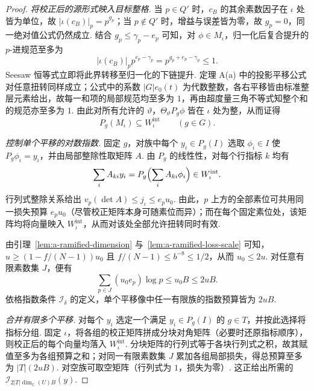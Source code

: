 \begin{proof}
\emph{将校正后的源形式映入目标整格.}
当 $p\in Q'$ 时，$c_B$ 的其余素数因子在 $\iota$ 处皆为单位，故 $|\iota(c_B)|_p=p^{g_p}$；当 $p\notin Q'$ 时，增益与误差皆为零，故 $g_p=0$，同一绝对值公式仍然成立. 结合 $g_p\le\gamma_p-e_p$ 可知，对 $\phi\in M_\iota$，归一化后复合提升的 $p$-进规范至多为
\[
 |\iota(c_B)|_p p^{e_p-\gamma_p}=p^{g_p+e_p-\gamma_p}\le1 .
\]
Seesaw 恒等式立即将此界转移至归一化的下链提升. 定理 A(a) 中的投影平移公式对任意扭转同样成立；公式中的系数 $|G|e_0(t)$ 为代数整数，各右平移皆由标准整层元素给出，故每一和项的局部规范均至多为 $1$，再由超度量三角不等式知整个和的规范亦至多为 $1$. 由此对所有允许的 $\vartheta$，$\Theta_\vartheta P_g\phi$ 皆在 $\iota$ 处为整，从而证得
\[
 P_g(M_\iota)\subseteq W_\iota^{\mathrm{int}}
 \qquad (g\in G).
\]

\emph{控制单个平移的对数指数.}
固定 $g$，对族中每个 $y_i\in P_g(I)$ 选取 $\phi_i\in I$ 使 $P_g\phi_i=y_i$，并由局部整除性取矩阵 $A$. 由 $P_g$ 的线性性，对每个行指标 $k$ 均有
\[
 \sum_i A_{ki}y_i=P_g\Bigl(\sum_i A_{ki}\phi_i\Bigr)\in W_\iota^{\mathrm{int}}.
\]
行列式整除关系给出 $v_p(\det A)\le j_\iota\le e_pu_0$. 由此，$p$ 上方的全部素位可共用同一损失预算 $e_pu_0$（尽管校正矩阵本身可随素位而异）；而在每个固定素位处，该矩阵均将向量映入 $W_\iota^{\mathrm{int}}$，从而对该处全部允许扭转同时有效.

由引理~\ref{lem:a-ramified-dimension} 与~\ref{lem:a-ramified-loss-scale} 可知，$u\ge(1-f/(N-1))u_0$ 且 $f/(N-1)\le b^{-8}\le1/2$，从而 $u_0\le2u$. 对任意有限素数集 $J$，便有
\[
 \sum_{p\in J}(u_0e_p)\log p
 \le u_0B\le2uB.
\]
依格指数条件 $\mathcal I_\delta$ 的定义，单个平移像中任一有限族的指数预算皆为 $2uB$.

\emph{合并有限多个平移.}
对每个 $y_i$ 选定一个满足 $y_i\in P_g(I)$ 的 $g\in T$，并按此选择将指标分组. 固定 $\iota$，将各组的校正矩阵拼成分块对角矩阵（必要时还原指标顺序），则校正后的每个向量均落入 $W_\iota^{\mathrm{int}}$. 分块矩阵的行列式等于各块行列式之积，故其赋值至多为各组预算之和；对同一有限素数集 $J$ 累加各组局部损失，得总预算至多为 $|T|(2uB)$. 对空族可取空矩阵（行列式为 $1$，损失为零）. 这正给出所需的 $\mathcal I_{2|T|\dim_{\mathbb C}(U)B}(y)$.
\end{proof}

